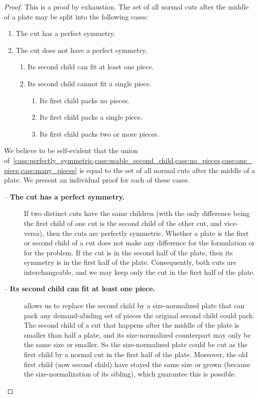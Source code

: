 \documentclass[ppgc,tese,english,formais,babel]{iiufrgs}
\begin{document}
\begin{proof} This is a proof by exhaustion. The set of all normal cuts after the middle of a plate may be split into the following cases:
\begin{enumerate}
  \item The cut has a perfect symmetry. \label{case:perfectly_symmetric}
  \item The cut does not have a perfect symmetry.
  \begin{enumerate}
    \item Its second child can fit at least one piece. \label{case:usable_second_child}
    \item Its second child cannot fit a single piece.
    \begin{enumerate}
      \item Its first child packs no pieces. \label{case:no_pieces}
      \item Its first child packs a single piece. \label{case:one_piece} %
      \item Its first child packs two or more pieces. \label{case:many_pieces}
    \end{enumerate}
  \end{enumerate}
\end{enumerate}

We believe to be self-evident that the union of~\cref{case:perfectly_symmetric,case:usable_second_child,case:no_pieces,case:one_piece,case:many_pieces} is equal to the set of all normal cuts after the middle of a plate. We present an individual proof for each of these cases.

\begin{description}
\item[ -- \textbf{The cut has a perfect symmetry.}]
If two distinct cuts have the same children (with the only difference being the first child of one cut is the second child of the other cut, and vice-versa), then the cuts are perfectly symmetric.
Whether a plate is the first or second child of a cut does not make any difference for the formulation or for the problem.
If the cut is in the second half of the plate, then its symmetry is in the first half of the plate.
Consequently, both cuts are interchangeable, and we may keep only the cut in the first half of the plate.
\item[ -- \textbf{Its second child can fit at least one piece.}]
 allows us to replace the second child by a size-normalized plate that can pack any demand-abiding set of pieces the original second child could pack.
The second child of a cut that happens after the middle of the plate is smaller than half a plate, and its size-normalized counterpart may only be the same size or smaller.
So the size-normalized plate could be cut as the first child by a normal cut in the first half of the plate.
Moreover, the old first child (now second child) have stayed the same size or grown (because the size-normalization of its sibling), which guarantee this is possible.


\end{description}
\end{proof}
\end{document}

